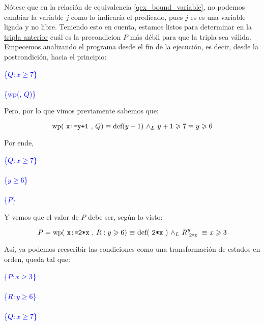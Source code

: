 \documentclass[../main.tex]{subfiles}
\begin{document}
Nótese que en la relación de equivalencia \ref{qex_bound_variable}, no podemos cambiar la variable $j$ como lo indicaría el predicado, pues $j$ es es una variable ligada y no libre.
\nln
Teniendo esto en cuenta, estamos listos para determinar en la \hyperref[specification_example_2_triplet]{tripla anterior} cuál es la precondicion $P$ más débil para que la tripla sea válida.
Empecemos analizando el programa desde el fin de la ejecución, es decir, desde la postcondición, hacia el principio:

\begin{center}
    \textcolor{blue}{\{$Q: x \geq 7$\}} \\
     \\
    \textcolor{blue}{\{wp(, $Q$)\}}
\end{center}
\nln

Pero, por lo que vimos previamente sabemos que:

\begin{equation*}
    \text{wp( \texttt{x:=y+1} , $Q$)} \equiv \text{def($y+1$) $\land _L$ $y+1 \geqslant 7$} \equiv y \geqslant 6
\end{equation*}

Por ende, 

\begin{center}
    \textcolor{blue}{\{$Q: x \geq 7$\}}   \\
                           \\
    \textcolor{blue}{\{$y \geq 6$\}}      \\
                          \\
    \textcolor{blue}{\{$P$\}}             \\
\end{center}
\nln

Y vemos que el valor de $P$ debe ser, según lo visto:

\begin{equation*}
    P = \text{wp( \texttt{x:=2*x} , $R: y \geqslant 6$) $\equiv$ def( \texttt{2*x} ) $\land _L$ $R_{\text{ \texttt{2*x} }}^y$ $\equiv$ $x \geqslant 3$} 
\end{equation*}

Así, ya podemos reescribir las condiciones como una transformación de estados en orden, queda tal que:

\begin{center}
    \textcolor{blue}{\{$P: x \geq 3$\}}   \\
                          \\
    \textcolor{blue}{\{$R: y \geq 6$\}}   \\
                           \\
    \textcolor{blue}{\{$Q: x \geq 7$\}}   \\
\end{center}
\nln
\end{document}
